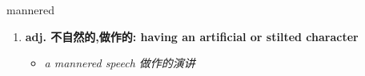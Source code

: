 
\begin{frame}
{\huge mannered}
\begin{center}
\begin{enumerate}\Large
  \item \textbf{adj. 不自然的,做作的: having an artificial or stilted character}
  \begin{itemize}
    \item \em{\Large{a mannered speech 做作的演讲}}
  \end{itemize}
\end{enumerate}
\end{center}
\end{frame}
